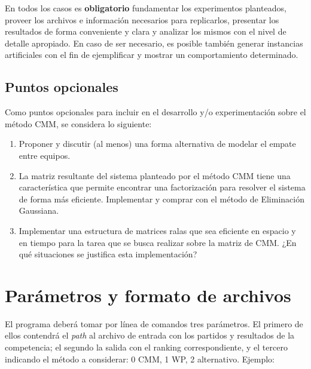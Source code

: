 \documentclass[11pt,a4paper]{article}
\begin{document}
En todos los casos es \textbf{obligatorio} fundamentar los experimentos planteados, proveer los archivos e información necesarios para replicarlos, presentar los 
resultados de forma conveniente y clara y analizar los mismos con el nivel de detalle apropiado. En caso de ser necesario, es posible también generar
instancias artificiales con el fin de ejemplificar y mostrar un comportamiento determinado.

\subsection*{Puntos opcionales}

Como puntos opcionales para incluir en el desarrollo y/o experimentación sobre el método CMM, se considera lo siguiente:
%
\begin{enumerate}

\item Proponer y discutir (al menos) una forma alternativa de modelar el empate entre equipos.

\item La matriz resultante del sistema planteado por el método CMM tiene una característica que permite encontrar una factorización para resolver el sistema de forma más eficiente. Implementar y comprar con el método de Eliminación Gaussiana.

\item Implementar una estructura de matrices ralas que sea eficiente en espacio y en tiempo para la tarea que se busca realizar sobre la matriz de CMM. ¿En qué situaciones se justifica esta implementación?


\end{enumerate}


\section*{Parámetros y formato de archivos}

El programa deberá tomar por línea de comandos tres parámetros. El primero de ellos contendrá el \textit{path} al archivo de entrada con los partidos y resultados de la competencia; el segundo la salida con el ranking correspondiente, y el tercero indicando el método a considerar: 0 CMM, 1 WP, 2 alternativo. Ejemplo:
\end{document}
